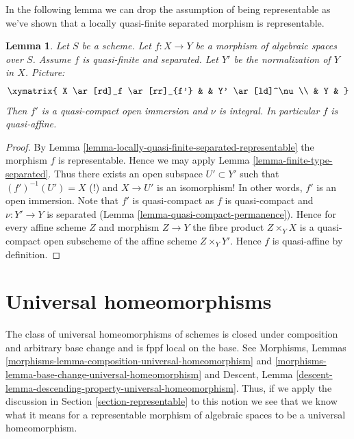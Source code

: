 \documentclass{stacks-project}
\theoremstyle{plain}
\newtheorem{lemma}[subsection]{Lemma}
\theoremstyle{definition}
\theoremstyle{remark}
\numberwithin{equation}{subsection}
\begin{document}
\noindent
In the following lemma we can drop the assumption of being
representable as we've shown that a locally quasi-finite
separated morphism is representable.

\begin{lemma}
\label{lemma-quasi-finite-separated-quasi-affine}
Let $S$ be a scheme.
Let $f : X \to Y$ be a morphism of algebraic spaces over $S$.
Assume $f$ is quasi-finite and separated.
Let $Y'$ be the normalization of $Y$ in $X$.
Picture:
$$
\xymatrix{
X \ar[rd]_f \ar[rr]_{f'} & & Y' \ar[ld]^\nu \\
& Y &
}
$$
Then $f'$ is a quasi-compact open immersion and $\nu$ is integral.
In particular $f$ is quasi-affine.
\end{lemma}

\begin{proof}
By Lemma \ref{lemma-locally-quasi-finite-separated-representable}
the morphism $f$ is representable. Hence we may apply
Lemma \ref{lemma-finite-type-separated}. Thus there exists an open
subspace $U' \subset Y'$ such that
$(f')^{-1}(U') = X$ (!) and $X \to U'$ is an isomorphism! In other
words, $f'$ is an open immersion. Note that $f'$ is quasi-compact as
$f$ is quasi-compact and $\nu : Y' \to Y$ is separated
(Lemma \ref{lemma-quasi-compact-permanence}).
Hence for every affine scheme $Z$ and morphism $Z \to Y$ the
fibre product $Z \times_Y X$ is a quasi-compact open subscheme
of the affine scheme $Z \times_Y Y'$. Hence $f$ is quasi-affine by
definition.
\end{proof}








\section{Universal homeomorphisms}
\label{section-universal-homeomorphisms}

\noindent
The class of universal homeomorphisms of schemes is closed under
composition and arbitrary base change and is fppf local on the base. See
Morphisms, Lemmas
\ref{morphisms-lemma-composition-universal-homeomorphism} and
\ref{morphisms-lemma-base-change-universal-homeomorphism} and
Descent, Lemma \ref{descent-lemma-descending-property-universal-homeomorphism}.
Thus, if we apply the discussion in
Section \ref{section-representable}
to this notion we see that we know what it means for a representable
morphism of algebraic spaces to be a universal homeomorphism.
\end{document}
